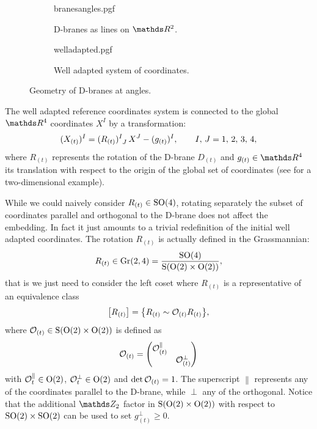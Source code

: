 \begin{figure}[tbp]
  \centering
  \begin{subfigure}[b]{0.45\linewidth}
    \centering
    {branesangles.pgf}
    \caption{D-branes as lines on $\R^2$.}
  \end{subfigure}
  \hfill
  \begin{subfigure}[b]{0.45\linewidth}
    \centering
    {welladapted.pgf}
    \caption{Well adapted system of coordinates.}
  \end{subfigure}
  \caption{%
    Geometry of D-branes at angles.
  }
  \label{fig:branes_at_angles}
\end{figure}

The well adapted reference coordinates system is connected to the global $\R^{4}$ coordinates $X^I$ by a transformation:
\begin{equation}
  \tensor{(X_{(t)})}{^I}
  =
  \tensor{(R_{(t)})}{^I_J}\, \tensor{X}{^J}
  -
  \tensor{(g_{(t)})}{^I},
  \qquad
  I,\, J = 1,\, 2,\, 3,\, 4,
  \label{eq:brane_rotation}
\end{equation}
where $R_{(t)}$ represents the rotation of the D-brane $D_{(t)}$ and $g_{(t)} \in \R^4$ its translation with respect to the origin of the global set of coordinates (see  for a two-dimensional example).

While we could naively consider $R_{(t)} \in \mathrm{SO}(4)$, rotating separately the subset of coordinates parallel and orthogonal to the D-brane does not affect the embedding.
In fact it just amounts to a trivial redefinition of the initial well adapted coordinates.
The rotation $R_{(t)}$ is actually defined in the Grassmannian:
\begin{equation}
  R_{(t)}
  \in
  \mathrm{Gr}(2, 4)
  =
  \frac{\mathrm{SO}(4)}{\mathrm{S}\qty( \mathrm{O}(2) \times \mathrm{O}(2) )},
\end{equation}
that is we just need to consider the left coset where $R_{(t)}$ is a representative of an equivalence class
\begin{equation}
  \qty[ R_{(t)} ]
  =
  \qty{ R_{(t)} \sim \cO_{(t)} R_{(t)} },
\end{equation}
where $\mathcal{O}_{(t)} \in \mathrm{S}\qty( \mathrm{O}(2) \times \mathrm{O}(2) )$ is defined as
\begin{equation}
  \cO_{(t)}
  =
  \mqty( \dmat{\cO^{\parallel}_{(t)}, \cO^{\perp}_{(t)}} )
\end{equation}
with $\mathcal{O}^{\parallel}_{t} \in \mathrm{O}(2)$, $\mathcal{O}^{\perp}_{t} \in \mathrm{O}(2)$ and $\det \mathcal{O}_{(t)} = 1$.
The superscript $\parallel$ represents any of the coordinates parallel to the D-brane, while $\perp$ any of the orthogonal.
Notice that the additional $\Z_2$ factor in $\mathrm{S}\qty( \mathrm{O}(2) \times \mathrm{O}(2) )$ with respect to $\mathrm{SO}(2) \times \mathrm{SO}(2)$ can be used to set $g_{(t)}^{\perp} \ge 0$.


